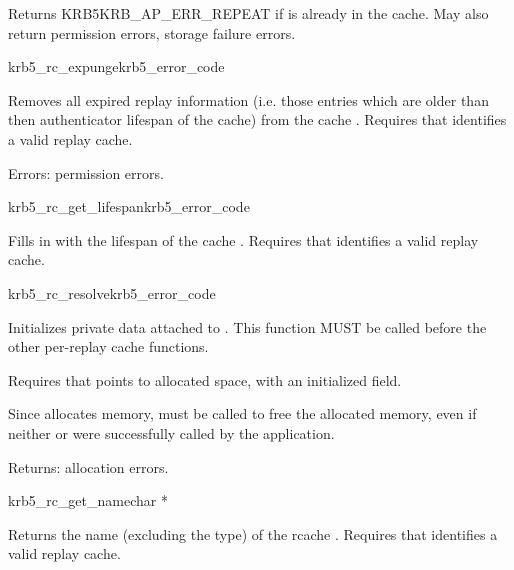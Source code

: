 Returns KRB5KRB_AP_ERR_REPEAT if  is already in the
cache.  May also return permission errors, storage failure errors.

\begin{funcdecl}{krb5_rc_expunge}{krb5_error_code}{\funcin}
\end{funcdecl}
Removes all expired replay information (i.e. those entries which are
older than then authenticator lifespan of the cache) from the cache
.  Requires that  identifies a valid replay
cache.

Errors: permission errors.

\begin{funcdecl}{krb5_rc_get_lifespan}{krb5_error_code}{\funcin}
\funcout
{}
\end{funcdecl}
Fills in  with the lifespan of
the cache .
Requires that  identifies a valid replay cache.

\begin{funcdecl}{krb5_rc_resolve}{krb5_error_code}{\funcinout}
\funcin
{}
\end{funcdecl}

Initializes private data attached to .  This function MUST
be called before the other per-replay cache functions.

Requires that  points to allocated space, with an
initialized  field.

Since  allocates memory,
 must be called to free the allocated memory,
even if neither  or
 were successfully called by the application.

Returns:  allocation errors.


\begin{funcdecl}{krb5_rc_get_name}{char *}{\funcin}
\end{funcdecl}

Returns the name (excluding the type) of the rcache .
Requires that  identifies a valid replay cache.


